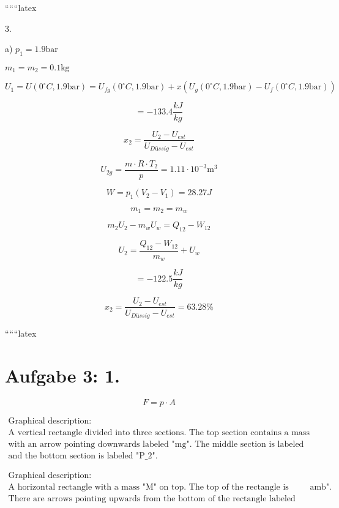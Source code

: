 
``````latex


3. 

a) $p_1 = 1.9 \text{bar}$

$m_1 = m_2 = 0.1 \text{kg}$

\[
U_1 = U(0^\circ C, 1.9 \text{bar}) = U_{fg}(0^\circ C, 1.9 \text{bar}) + x(U_g(0^\circ C, 1.9 \text{bar}) - U_f(0^\circ C, 1.9 \text{bar}))
\]

\[
= -133.4 \frac{kJ}{kg}
\]

\[
x_2 = \frac{U_2 - U_{est}}{U_{Düssig} - U_{est}}
\]

\[
U_{2g} = \frac{m \cdot R \cdot T_2}{p} = 1.11 \cdot 10^{-3} \text{m}^3
\]

\[
W = p_1 (V_2 - V_1) = 28.27J
\]

\[
m_1 = m_2 = m_w
\]

\[
m_2 U_2 - m_w U_w = Q_{12} - W_{12}
\]

\[
U_2 = \frac{Q_{12} - W_{12}}{m_w} + U_w
\]

\[
= -122.5 \frac{kJ}{kg}
\]

\[
x_2 = \frac{U_2 - U_{est}}{U_{Düssig} - U_{est}} = 63.28\%
\]

``````latex


\section*{Aufgabe 3: 1.}

\begin{equation*}
    F = p \cdot A
\end{equation*}

\[
\begin{array}{c}
\text{Graphical description:} \\
\text{A vertical rectangle divided into three sections. The top section contains a mass labeled "M"} \\
\text{with an arrow pointing downwards labeled "mg". The middle section is labeled "E w P_1"} \\
\text{and the bottom section is labeled "P_2".}
\end{array}
\]

\[
\begin{array}{c}
\text{Graphical description:} \\
\text{A horizontal rectangle with a mass "M" on top. The top of the rectangle is labeled "p_{amb}".} \\
\text{There are arrows pointing upwards from the bottom of the rectangle labeled "P_1".}
\end{array}
\]

